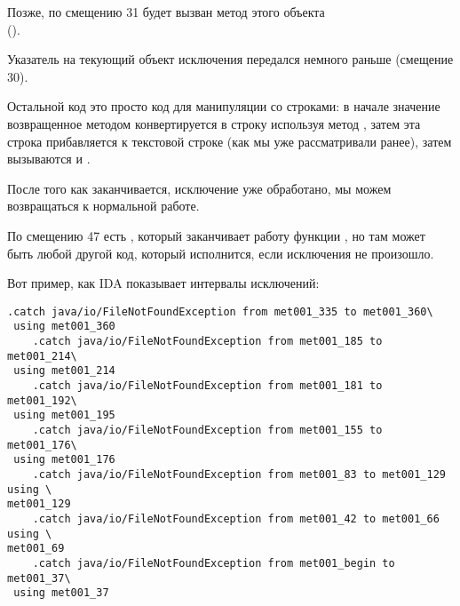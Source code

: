 Позже, по смещению 31 будет вызван метод этого объекта \\
().

Указатель  на текующий объект исключения передался немного раньше (смещение 30).

Остальной код это просто код для манипуляции со строками: 
в начале значение возвращенное методом 
конвертируется в строку используя метод , 
затем эта строка прибавляется к текстовой строке
 (как мы уже рассматривали ранее),
затем вызываются  и .

После того как  заканчивается, исключение уже обработано, мы можем
возвращаться к нормальной работе.

По смещению 47 есть , который заканчивает работу функции \main, 
но там может быть любой другой код, который исполнится, если исключения не произошло.

Вот пример, как IDA показывает интервалы исключений:

\begin{lstlisting}[caption=из какого-то случайного найденного на компьютере автора .class-файла]
    .catch java/io/FileNotFoundException from met001_335 to met001_360\
 using met001_360
    .catch java/io/FileNotFoundException from met001_185 to met001_214\
 using met001_214
    .catch java/io/FileNotFoundException from met001_181 to met001_192\
 using met001_195
    .catch java/io/FileNotFoundException from met001_155 to met001_176\
 using met001_176
    .catch java/io/FileNotFoundException from met001_83 to met001_129 using \
met001_129
    .catch java/io/FileNotFoundException from met001_42 to met001_66 using \
met001_69
    .catch java/io/FileNotFoundException from met001_begin to met001_37\
 using met001_37
\end{lstlisting}

